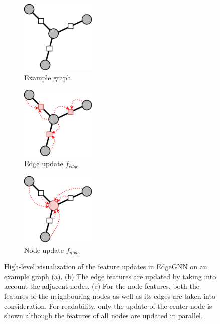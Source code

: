 \begin{figure}[t!]
    \centering
    \begin{subfigure}{.3\textwidth}
        \centering
        \includegraphics[height=3.5cm]{figures/methodology_figures/EdgeGNN/example_graph.pdf}
        \caption{Example graph}
        \label{fig:methodology_edgeGNN_example_graph}
    \end{subfigure}
    \hfill
    \begin{subfigure}{.3\textwidth}
        \centering
        \vfill
        \includegraphics[height=3.5cm]{figures/methodology_figures/EdgeGNN/edge_update.pdf}
        \caption{Edge update $f_{edge}$}
        \label{fig:methodology_edgeGNN_edge_update}
    \end{subfigure}
    \hfill
    \begin{subfigure}{.3\textwidth}
        \centering
        \includegraphics[height=3.5cm]{figures/methodology_figures/EdgeGNN/node_update.pdf}
        \caption{Node update $f_{node}$}
        \label{fig:methodology_edgeGNN_node_update}
    \end{subfigure}
    \caption[Edge and node udpates in EdgeGNN]{
    High-level visualization of the feature updates in EdgeGNN on an example graph (a). (b) The edge features are updated by taking into account the adjacent nodes. (c) For the node features, both the features of the neighbouring nodes as well as its edges are taken into consideration. For readability, only the update of the center node is shown although the features of all nodes are updated in parallel.}
    \label{fig:methodology_edgeGNN}
\end{figure}

